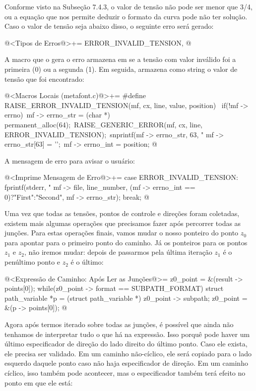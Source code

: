 {{{{{{Conforme visto na Subseção 7.4.3, o valor de tensão não pode ser menor
que 3/4, ou a equação que nos permite deduzir o formato da curva pode
não ter solução. Caso o valor de tensão seja abaixo disso, o seguinte
erro será gerado:

\iniciocodigo
@<Tipos de Erros@>+=
ERROR_INVALID_TENSION,
@
\fimcodigo

A macro que o gera o erro armazena em  se a
tensão com valor inválido foi a primeira (0) ou a segunda (1). Em
seguida, armazena como string o valor de tensão que foi encontrado:

\iniciocodigo
@<Macros Locais (metafont.c)@>+=
#define RAISE_ERROR_INVALID_TENSION(mf, cx, line, value, position) {\
  if(!mf -> errno){\
    mf -> errno_str = (char *) permanent_alloc(64);\
    RAISE_GENERIC_ERROR(mf, cx, line, ERROR_INVALID_TENSION);\
    snprintf(mf -> errno_str, 63, "%
    mf -> errno_str[63] = '\0';\
    mf -> errno_int = position;}}
@
\fimcodigo

A mensagem de erro para avisar o usuário:

\iniciocodigo
@<Imprime Mensagem de Erro@>+=
case ERROR_INVALID_TENSION:
  fprintf(stderr,
          "%
          mf -> file, line_number, (mf -> errno_int == 0)?"First":"Second",
          mf -> errno_str);
  break;
@
\fimcodigo

Uma vez que todas as tensões, pontos de controle e direções foram
coletadas, existem mais algumas operações que precisamos fazer após
percorrer todas as junções. Para estas operações finais, vamos mudar o
nosso ponteiro do ponto $z_0$ para apontar para o primeiro ponto do
caminho. Já os ponteiros para os pontos $z_1$ e $z_2$, não iremos
mudar: depois de passarmos pela última iteração $z_1$ é o penúltimo
ponto e $z_2$ é o último:

\iniciocodigo
@<Expressão de Caminho: Após Ler as Junções@>=
z0_point = &(result -> points[0]);
while(z0_point -> format == SUBPATH_FORMAT){
  struct path_variable *p = (struct path_variable *) z0_point -> subpath;
  z0_point = &(p -> points[0]);
}
@
\fimcodigo

Agora após termos iterado sobre todas as junções, é possível que
ainda não tenhamos de interpretar tudo o que há na expressão. Isso
porquê pode haver um último especificador de direção do lado direito
do último ponto. Caso ele exista, ele precisa ser validado. Em um
caminho não-cíclico, ele será copiado para o lado esquerdo daquele
ponto caso não haja especificador de direção. Em um caminho cíclico,
isso também pode acontecer, mas o especificador também terá efeito no
ponto em que ele está:

}}}}}}
